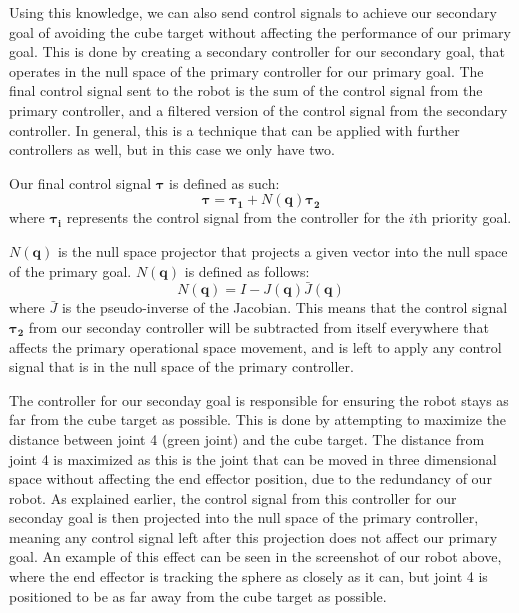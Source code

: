 \documentclass[11pt]{article}
\begin{document}
Using this knowledge, we can also send control signals to achieve our secondary goal of avoiding the cube target without affecting the performance of our primary goal. This is done by creating a secondary controller for our secondary goal, that operates in the null space of the primary controller for our primary goal. The final control signal sent to the robot is the sum of the control signal from the primary controller, and a filtered version of the control signal from the secondary controller. In general, this is a technique that can be applied with further controllers as well, but in this case we only have two.

Our final control signal \(\pmb{\tau}\) is defined as such: \[\pmb{\tau} = \pmb{\tau_1} + N(\pmb{q})\pmb{\tau_2}\] where \(\pmb{\tau_i}\) represents the control signal from the controller for the \(i\)th priority goal.

\(N(\pmb{q})\) is the null space projector that projects a given vector into the null space of the primary goal. \(N(\pmb{q})\) is defined as follows: \[N(\pmb{q}) = I - J(\pmb{q}) \bar{J}(\pmb{q})\] where \(\bar{J}\) is the pseudo-inverse of the Jacobian. This means that the control signal \(\pmb{\tau_2}\) from our seconday controller will be subtracted from itself everywhere that affects the primary operational space movement, and is left to apply any control signal that is in the null space of the primary controller.

The controller for our seconday goal is responsible for ensuring the robot stays as far from the cube target as possible. This is done by attempting to maximize the distance between joint 4 (green joint) and the cube target. The distance from joint 4 is maximized as this is the joint that can be moved in three dimensional space without affecting the end effector position, due to the redundancy of our robot. As explained earlier, the control signal from this controller for our seconday goal is then projected into the null space of the primary controller, meaning any control signal left after this projection does not affect our primary goal. An example of this effect can be seen in the screenshot of our robot above, where the end effector is tracking the sphere as closely as it can, but joint 4 is positioned to be as far away from the cube target as possible.
\end{document}
